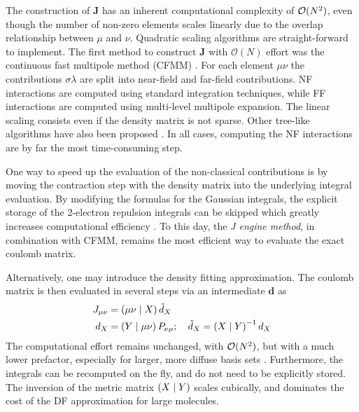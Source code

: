 \begin{center}
\end{center}

\noindent The construction of $\mathbf{J}$ has an inherent computational complexity of $\mathcal{O}(N^{2})$, even though the number of non-zero elements scales linearly due to the overlap relationship between $\mu$ and $\nu$. Quadratic scaling algorithms are straight-forward to implement. The first method to construct $\mathbf{J}$ with $\mathcal{O}(N)$ effort was the continuous fast multipole method (CFMM) \cite{Whi1996}. For each element $\mu\nu$ the contributions $\sigma\lambda$ are split into near-field and far-field contributions. NF interactions are computed using standard integration techniques, while FF interactions are computed using multi-level multipole expansion. The linear scaling consists even if the density matrix is not sparse. Other tree-like algorithms have also been proposed \cite{Str1996,Cha1996}. In all cases, computing the NF interactions are by far the most time-consuming step.

One way to speed up the evaluation of the non-classical contributions is by moving the contraction step with the density matrix into the underlying integral evaluation. By modifying the formulas for the Gaussian integrals, the explicit storage of the 2-electron repulsion integrals can be skipped which greatly increases computational efficiency \cite{Whi1996,Sha2000,Sha2001}. To this day, the \emph{J engine method}, in combination with CFMM, remains the most efficient way to evaluate the exact coulomb matrix.

Alternatively, one may introduce the density fitting approximation. The coulomb matrix is then evaluated in several steps via an intermediate $\mathbf{d}$ as 
\begin{align}
J_{\mu\nu} &= \left( \mu\nu \mid X \right) \tilde{d}_X \\
d_X &= \left( Y \mid \mu\nu \right) P_{\nu\mu} ; \quad \tilde{d}_X = \left( X \mid Y \right)^{-1} d_X 
\end{align}
\noindent The computational effort remains unchanged, with $\mathcal{O}(N^{2})$, but with a much lower prefactor, especially for larger, more diffuse basis sets \cite{Wei2002}. Furthermore, the integrals can be recomputed on the fly, and do not need to be explicitly stored. The inversion of the metric matrix $\left( X \mid Y \right)$ scales cubically, and dominates the cost of the DF approximation for large molecules. 

